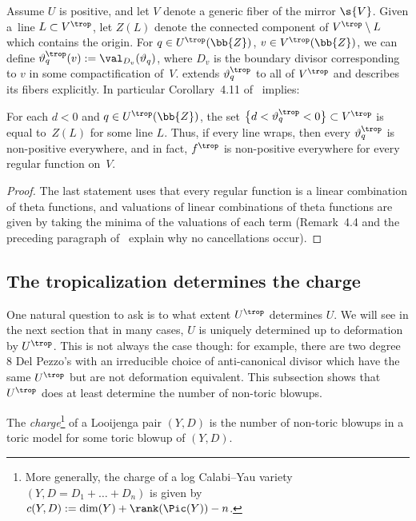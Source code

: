 Assume $U$ is positive, and let $V$ denote a generic fiber of the mirror $\s{V}$. Given a~line \mbox{$L\subset V^{\trop}$}, let $Z(L)$ denote the connected component of $V^{\trop}\setminus L$ which contains the origin. For $q\in U^{\trop}(\bb{Z})$, $v\in V^{\trop}(\bb{Z})$, we can define $\vartheta_q^{\trop}(v):=\val_{D_v}(\vartheta_q)$, where $D_v$ is the boundary divisor corresponding to $v$ in some compactification of~$V$. \cite{Man1} extends $\vartheta_q^{\trop}$ to all of $V^{\trop}$ and describes its fibers explicitly. In particular Corollary~4.11 of~\cite{Man1} implies:
\begin{lem}\label{NegativeFibers}
For each $d<0$ and $q\in U^{\trop}(\bb{Z})$, the set $\big\{d<\vartheta_q^{\trop}<0\big\}\subset V^{\trop}$ is equal to~$Z(L)$ for some line $L$. Thus, if every line wraps, then every $\vartheta_q^{\trop}$ is non-positive everywhere, and in fact, $f^{\trop}$ is non-positive everywhere for every regular function on~$V$.
\end{lem}
\begin{proof}
The last statement uses that every regular function is a linear combination of theta functions, and valuations of linear combinations of theta functions are given by taking the minima of the valuations of each term (Remark~4.4 and the preceding paragraph of~\cite{Man1} explain why no cancellations occur).
\end{proof}

\subsection{The tropicalization determines the charge}\label{trop-charge}

One natural question to ask is to what extent $U^{\trop}$ determines $U$. We will see in the next section that in many cases, $U$ is uniquely determined up to deformation by $U^{\trop}$. This is not always the case though: for example, there are two degree $8$ Del Pezzo's with an irreducible choice of anti-canonical divisor which have the same $U^{\trop}$ but are not deformation equivalent. This subsection shows that $U^{\trop}$ does at least determine the number of non-toric blowups.

\begin{dfn}The {\it charge}\footnote{More generally, the charge of a log Calabi--Yau variety $(Y,D=D_1+\dots+D_n)$ is given by $c(Y,D):=\dim(Y)+\rank(\Pic(Y))-n$.} of a Looijenga pair $(Y,D)$ is the number of non-toric blowups in a toric model for some toric blowup of $(Y,D)$.
\end{dfn}

